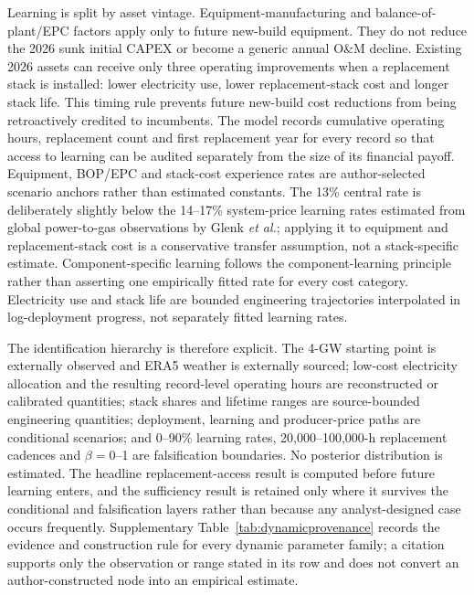 \documentclass[pdflatex,sn-nature]{sn-jnl}
\begin{document}
Learning is split by asset vintage. Equipment-manufacturing and balance-of-plant/EPC factors apply only to future new-build equipment. They do not reduce the 2026 sunk initial CAPEX or become a generic annual O\&M decline. Existing 2026 assets can receive only three operating improvements when a replacement stack is installed: lower electricity use, lower replacement-stack cost and longer stack life. This timing rule prevents future new-build cost reductions from being retroactively credited to incumbents. The model records cumulative operating hours, replacement count and first replacement year for every record so that access to learning can be audited separately from the size of its financial payoff. Equipment, BOP/EPC and stack-cost experience rates are author-selected scenario anchors rather than estimated constants. The 13\% central rate is deliberately slightly below the 14--17\% system-price learning rates estimated from global power-to-gas observations by Glenk \emph{et al.}\cite{glenk2023}; applying it to equipment and replacement-stack cost is a conservative transfer assumption, not a stack-specific estimate. Component-specific learning follows the component-learning principle rather than asserting one empirically fitted rate for every cost category\cite{ferioli2009,zeyen2023}. Electricity use and stack life are bounded engineering trajectories interpolated in log-deployment progress, not separately fitted learning rates\cite{doe2024,worldbank2026,iea2025}.

The identification hierarchy is therefore explicit. The 4-GW starting point is externally observed and ERA5 weather is externally sourced; low-cost electricity allocation and the resulting record-level operating hours are reconstructed or calibrated quantities; stack shares and lifetime ranges are source-bounded engineering quantities; deployment, learning and producer-price paths are conditional scenarios; and 0--90\% learning rates, 20,000--100,000-h replacement cadences and $\beta=0$--1 are falsification boundaries. No posterior distribution is estimated. The headline replacement-access result is computed before future learning enters, and the sufficiency result is retained only where it survives the conditional and falsification layers rather than because any analyst-designed case occurs frequently. Supplementary Table~\ref{tab:dynamicprovenance} records the evidence and construction rule for every dynamic parameter family; a citation supports only the observation or range stated in its row and does not convert an author-constructed node into an empirical estimate.
\end{document}
